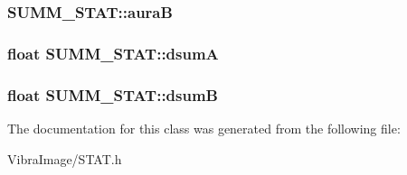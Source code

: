 \hypertarget{class_s_u_m_m___s_t_a_t_aa4bd77e99f011e0c72809be3644521d5}{
\subsubsection[{aura\+B}]{ S\+U\+M\+M\+\_\+\+S\+T\+A\+T\+::aura\+B}}\label{class_s_u_m_m___s_t_a_t_aa4bd77e99f011e0c72809be3644521d5}




\hypertarget{class_s_u_m_m___s_t_a_t_afc39513fb57523e6b0f5031e0b028bb2}{
\subsubsection[{dsum\+A}]{\setlength{\rightskip}{0pt plus 5cm}float S\+U\+M\+M\+\_\+\+S\+T\+A\+T\+::dsum\+A}}\label{class_s_u_m_m___s_t_a_t_afc39513fb57523e6b0f5031e0b028bb2}




\hypertarget{class_s_u_m_m___s_t_a_t_ac9723fe5df3465505a22fa8eb259bccd}{
\subsubsection[{dsum\+B}]{\setlength{\rightskip}{0pt plus 5cm}float S\+U\+M\+M\+\_\+\+S\+T\+A\+T\+::dsum\+B}}\label{class_s_u_m_m___s_t_a_t_ac9723fe5df3465505a22fa8eb259bccd}






The documentation for this class was generated from the following file\+:\begin{DoxyCompactItemize}
\item 
Vibra\+Image/S\+T\+A\+T.\+h\end{DoxyCompactItemize}
